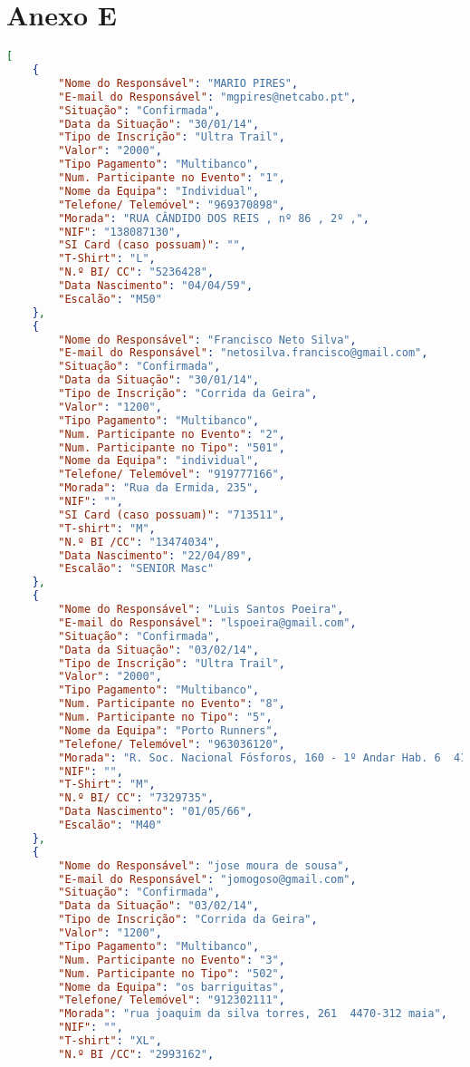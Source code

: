 \documentclass[11pt,a4paper]{report}
\begin{document}
    \section{Anexo E}
    \hypertarget{Anexo E}{}
    \begin{lstlisting}[language=json,firstnumber=1]
[
    {
		"Nome do Responsável": "MARIO PIRES",
		"E-mail do Responsável": "mgpires@netcabo.pt",
		"Situação": "Confirmada",
		"Data da Situação": "30/01/14",
		"Tipo de Inscrição": "Ultra Trail",
		"Valor": "2000",
		"Tipo Pagamento": "Multibanco",
		"Num. Participante no Evento": "1",
		"Nome da Equipa": "Individual",
		"Telefone/ Telemóvel": "969370898",
		"Morada": "RUA CÂNDIDO DOS REIS , nº 86 , 2º ,",
		"NIF": "138087130",
		"SI Card (caso possuam)": "",
		"T-Shirt": "L",
		"N.º BI/ CC": "5236428",
		"Data Nascimento": "04/04/59",
		"Escalão": "M50"
	},
	{
    	"Nome do Responsável": "Francisco Neto Silva",
		"E-mail do Responsável": "netosilva.francisco@gmail.com",
		"Situação": "Confirmada",
		"Data da Situação": "30/01/14",
		"Tipo de Inscrição": "Corrida da Geira",
		"Valor": "1200",
		"Tipo Pagamento": "Multibanco",
		"Num. Participante no Evento": "2",
		"Num. Participante no Tipo": "501",
		"Nome da Equipa": "individual",
		"Telefone/ Telemóvel": "919777166",
		"Morada": "Rua da Ermida, 235",
		"NIF": "",
		"SI Card (caso possuam)": "713511",
		"T-shirt": "M",
		"N.º BI /CC": "13474034",
		"Data Nascimento": "22/04/89",
		"Escalão": "SENIOR Masc"
	},
	{
		"Nome do Responsável": "Luis Santos Poeira",
		"E-mail do Responsável": "lspoeira@gmail.com",
		"Situação": "Confirmada",
		"Data da Situação": "03/02/14",
		"Tipo de Inscrição": "Ultra Trail",
		"Valor": "2000",
		"Tipo Pagamento": "Multibanco",
		"Num. Participante no Evento": "8",
		"Num. Participante no Tipo": "5",
		"Nome da Equipa": "Porto Runners",
		"Telefone/ Telemóvel": "963036120",
		"Morada": "R. Soc. Nacional Fósforos, 160 - 1º Andar Hab. 6  4150 Porto",
		"NIF": "",
		"T-Shirt": "M",
		"N.º BI/ CC": "7329735",
		"Data Nascimento": "01/05/66",
		"Escalão": "M40"
	},
	{
		"Nome do Responsável": "jose moura de sousa",
		"E-mail do Responsável": "jomogoso@gmail.com",
		"Situação": "Confirmada",
		"Data da Situação": "03/02/14",
		"Tipo de Inscrição": "Corrida da Geira",
		"Valor": "1200",
		"Tipo Pagamento": "Multibanco",
		"Num. Participante no Evento": "3",
		"Num. Participante no Tipo": "502",
		"Nome da Equipa": "os barriguitas",
		"Telefone/ Telemóvel": "912302111",
		"Morada": "rua joaquim da silva torres, 261  4470-312 maia",
		"NIF": "",
		"T-shirt": "XL",
		"N.º BI /CC": "2993162",

\end{lstlisting}
\end{document}
